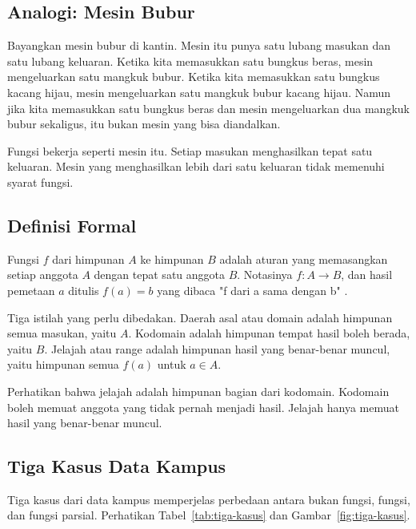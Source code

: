 \documentclass[11pt,a4paper]{article}
\begin{document}
\subsection{Analogi: Mesin Bubur}

Bayangkan mesin bubur di kantin. Mesin itu punya satu lubang masukan dan satu lubang keluaran. Ketika kita memasukkan satu bungkus beras, mesin mengeluarkan satu mangkuk bubur. Ketika kita memasukkan satu bungkus kacang hijau, mesin mengeluarkan satu mangkuk bubur kacang hijau. Namun jika kita memasukkan satu bungkus beras dan mesin mengeluarkan dua mangkuk bubur sekaligus, itu bukan mesin yang bisa diandalkan.

Fungsi bekerja seperti mesin itu. Setiap masukan menghasilkan tepat satu keluaran. Mesin yang menghasilkan lebih dari satu keluaran tidak memenuhi syarat fungsi.

\subsection{Definisi Formal}

Fungsi $f$ dari himpunan $A$ ke himpunan $B$ adalah aturan yang memasangkan setiap anggota $A$ dengan tepat satu anggota $B$. Notasinya $f:A \to B$, dan hasil pemetaan $a$ ditulis $f(a)=b$ yang dibaca "f dari a sama dengan b" \cite{rosen}.

Tiga istilah yang perlu dibedakan. Daerah asal atau domain adalah himpunan semua masukan, yaitu $A$. Kodomain adalah himpunan tempat hasil boleh berada, yaitu $B$. Jelajah atau range adalah himpunan hasil yang benar-benar muncul, yaitu himpunan semua $f(a)$ untuk $a \in A$.

Perhatikan bahwa jelajah adalah himpunan bagian dari kodomain. Kodomain boleh memuat anggota yang tidak pernah menjadi hasil. Jelajah hanya memuat hasil yang benar-benar muncul.

\subsection{Tiga Kasus Data Kampus}

Tiga kasus dari data kampus memperjelas perbedaan antara bukan fungsi, fungsi, dan fungsi parsial. Perhatikan Tabel~\ref{tab:tiga-kasus} dan Gambar~\ref{fig:tiga-kasus}.
\end{document}
